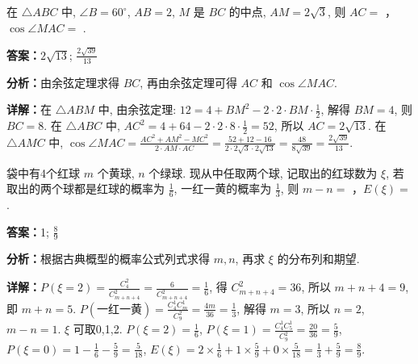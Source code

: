 \begin{question}[points=6]
在 $\triangle ABC$ 中, $\angle B = 60^\circ$, $AB=2$, $M$ 是 $BC$ 的中点, $AM=2\sqrt{3}$, 则 $AC=$ ，$\cos\angle MAC=$ .
\begin{solution}
\textbf{答案：}$2\sqrt{13}$; $\frac{2\sqrt{39}}{13}$

\textbf{分析：}由余弦定理求得 $BC$, 再由余弦定理可得 $AC$ 和 $\cos\angle MAC$.

\textbf{详解：}在 $\triangle ABM$ 中, 由余弦定理: $12=4+BM^2-2\cdot2\cdot BM\cdot\frac12$, 解得 $BM=4$, 则 $BC=8$. 在 $\triangle ABC$ 中, $AC^2=4+64-2\cdot2\cdot8\cdot\frac12=52$, 所以 $AC=2\sqrt{13}$. 在 $\triangle AMC$ 中, $\cos\angle MAC = \frac{AC^2+AM^2-MC^2}{2\cdot AM\cdot AC} = \frac{52+12-16}{2\cdot2\sqrt{3}\cdot2\sqrt{13}} = \frac{48}{8\sqrt{39}} = \frac{2\sqrt{39}}{13}$.
\end{solution}
\end{question}

\begin{question}[points=6]
袋中有4个红球 $m$ 个黄球, $n$ 个绿球. 现从中任取两个球, 记取出的红球数为 $\xi$, 若取出的两个球都是红球的概率为 $\frac{1}{6}$, 一红一黄的概率为 $\frac{1}{3}$, 则 $m-n=$ ，$E(\xi)=$ .
\fillin[{1; $\frac{8}{9}$}]
\begin{solution}
\textbf{答案：}1; $\frac{8}{9}$

\textbf{分析：}根据古典概型的概率公式列式求得 $m,n$, 再求 $\xi$ 的分布列和期望.

\textbf{详解：}$P(\xi=2)=\frac{C_4^2}{C_{m+n+4}^2}=\frac{6}{C_{m+n+4}^2}=\frac16$, 得 $C_{m+n+4}^2=36$, 所以 $m+n+4=9$, 即 $m+n=5$. $P(\text{一红一黄})=\frac{C_4^1 C_m^1}{C_9^2}=\frac{4m}{36}=\frac13$, 解得 $m=3$, 所以 $n=2$, $m-n=1$. $\xi$ 可取0,1,2. $P(\xi=2)=\frac16$, $P(\xi=1)=\frac{C_4^1 C_5^1}{C_9^2}=\frac{20}{36}=\frac59$, $P(\xi=0)=1-\frac16-\frac59=\frac{5}{18}$, $E(\xi)=2\times\frac16+1\times\frac59+0\times\frac{5}{18}=\frac13+\frac59=\frac89$.
\end{solution}
\end{question}

